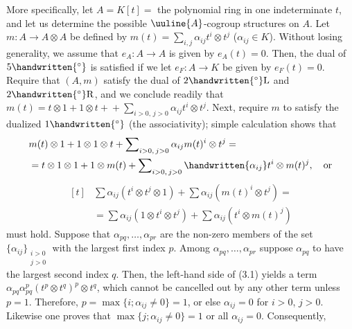 More specifically, let $A=K[t]={}$ the polynomial ring in one indeterminate $t$, and let us determine the possible $\uuline{A}$-cogroup structures on $A$. Let $m:A\to A\otimes A$ be defined
by $m(t)=\displaystyle\sum_{i,j}\alpha_{ij}t^i\otimes t^j$ ($\alpha_{ij}\in K$). Without losing generality, we assume that $e_A:A\to A$ is given by $e_A(t)=0$. Then, the dual of $5\handwritten{^\circ}$ is satisfied if we let $e_F:A\to K$ be given by
$e_F(t)=0$. Require that $(A,m)$ satisfy the dual of $2\handwritten{^\circ}\mathrm L$ and $2\handwritten{^\circ}\mathrm R$, and we conclude readily that $m(t)=t\otimes1+1\otimes t+{}+\sum\nolimits_{i>0,\,j>0}\alpha_{ij}t^i\otimes t^j$. Next, require $m$ to satisfy the dualized $1\handwritten{^\circ}$ (the associativity); simple calculation shows that
\[
\begin{aligned}
 &m(t)\otimes1+1\otimes1\otimes t+\sum\nolimits_{i>0,\,j>0}\alpha_{ij}m(t)^i\otimes t^j={}\\
 &{}=t\otimes1\otimes1+1\otimes m(t)+\sum\nolimits_{i>0,\,j>0}\handwritten{\alpha_{ij}}t^i\otimes m(t)^j,\quad\text{or}
\end{aligned}
\]
\begingroup\makeatletter\tagsleft@true\makeatother
\[
\begin{aligned}[t]
 &\sum\alpha_{ij}(t^i\otimes t^j\otimes1)+\sum\alpha_{ij}(m(t)^i\otimes t^j)={}\\
 &{}=\sum\alpha_{ij}(1\otimes t^i\otimes t^j)+\sum\alpha_{ij}(t^i\otimes m(t)^j)
\end{aligned}\tag*{(3.1)}
\]
\endgroup
must hold. Suppose that $\alpha_{pq},\ldots,\alpha_{pr}$ are the non-zero members of the set $\{\alpha_{ij}\}_{\substack{i>0\\j>0}}$ with the largest first index $p$. Among $\alpha_{pq},\ldots,\alpha_{pr}$ suppose $\alpha_{pq}$ to have the largest second index $q$. Then, the left-hand side of (3.1) yields a term
$\alpha_{pq}\alpha_{pq}^p(t^p\otimes t^q)^p\otimes t^q$, which cannot be cancelled out by any other term unless $p=1$. Therefore, $p=\max\{i;\alpha_{ij}\ne0\}=1$, or else $\alpha_{ij}=0$ for $i>0$, $j>0$. Likewise one proves that $\max\{j;\alpha_{ij}\ne0\}=1$ or all $\alpha_{ij}=0$. Consequently,

